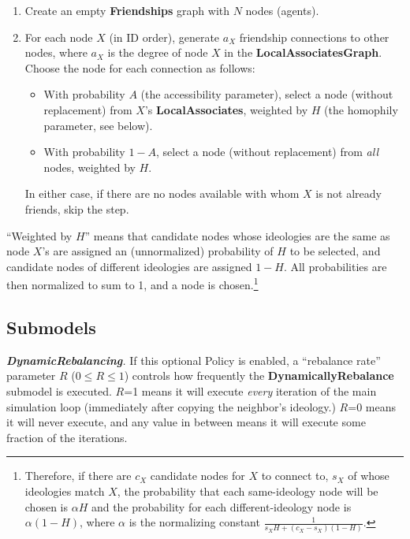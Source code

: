 \begin{enumerate}
\item Create an empty \textbf{Friendships} graph with $N$ nodes (agents).
\item For each node $X$ (in ID order), generate $a_X$ friendship connections
to other nodes, where $a_X$ is the degree of node $X$ in the
\textbf{LocalAssociatesGraph}. Choose the node for each connection as follows:
    \begin{itemize}
    \item With probability $A$ (the accessibility parameter), select a node
(without replacement) from $X$'s \textbf{LocalAssociates}, weighted by $H$
(the homophily parameter, see below).
    \item With probability $1-A$, select a node (without replacement) from
\textit{all} nodes, weighted by $H$.
    \end{itemize}
    In either case, if there are no nodes available with whom $X$ is not
already friends, skip the step.
\end{enumerate}

``Weighted by $H$'' means that candidate nodes whose ideologies are the same as
node $X$'s are assigned an (unnormalized) probability of $H$ to be selected,
and candidate nodes of different ideologies are assigned $1-H$. All
probabilities are then normalized to sum to 1, and a node is chosen.\footnote{
Therefore, if there are $c_X$ candidate nodes for $X$ to connect to, $s_X$ of
whose ideologies match $X$, the probability that each same-ideology node will
be chosen is $\alpha H$ and the probability for each different-ideology node
is $\alpha (1-H)$, where $\alpha$ is the normalizing constant $\frac{1}{s_X H
+ (c_X-s_X)(1-H)}$.}



\subsection{Submodels}

\textit{\textbf{DynamicRebalancing}.} If this optional Policy is enabled, a
``rebalance rate'' parameter $R$ ($0 \leq R \leq 1$) controls how frequently
the \textbf{DynamicallyRebalance} submodel is executed. $R$=1 means it will
execute \textit{every} iteration of the main simulation loop (immediately
after copying the neighbor's ideology.) $R$=0 means it will never execute, and
any value in between means it will execute some fraction of the iterations.

